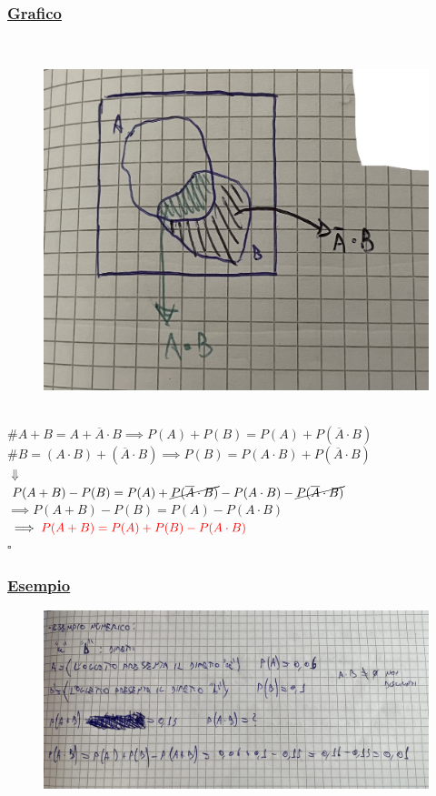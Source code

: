 \documentclass{article}
\begin{document}
\begin{itemize}
    \subsubsection{\underline{Grafico}} ~\\
    \begin{figure}[ht]
    \centering
    \includegraphics[scale=0.13]{images/22.Prop5_4.5.jpeg} 
    \end{figure} \\
    $\# A+B = A + \overline A \cdot B \implies P(A)+P(B) = P(A) + P(\overline A \cdot B)$ \\
    $\# B = (A \cdot B) + (\overline A \cdot B) \implies P(B) = P(A \cdot B) + P(\overline A \cdot B)$ \\
    $\Downarrow$ \\
    $P(A+B)-P(B) = P(A) + \cancel{P(\overline A \cdot B)} - P(A \cdot B) - \cancel{P(\overline A \cdot B)}$ \\
    $\implies P(A+B)-P(B) = P(A) - P(A \cdot B)$ \\
    $\implies \color{red}P(A+B) = P(A) + P(B) - P(A \cdot B)$ \\
    \hspace*{0pt}\hfill $\square$ 
\end{itemize}
\newpage
\subsubsection{\underline{Esempio}} 
\begin{figure}[ht]
\centering
\includegraphics[scale=0.13]{ese/1.jpeg} 
\end{figure}
\end{document}
